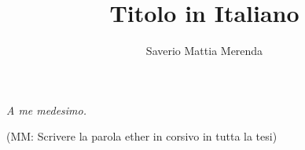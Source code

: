 \documentclass{theme/uniprthesis}
\title{Titolo in Italiano}
\author{Saverio Mattia Merenda}
\newcommand{\varemark}[2]{{\color{dkred}(#1: #2)}}
\newcommand{\mm}[1]{\varemark{MM}{#1}}
\newcommand{\mm}[1]{}
\begin{document}
\maketitle

\newpage
\thispagestyle{empty}
\null{}
\begin{flushright}
	\textit{A me medesimo.}
\end{flushright}
\null
\newpage

\pagestyle{plain}
\tableofcontents

\listoffigures    %
\listofalgorithms %


\mm{Scrivere la parola ether in corsivo in tutta la tesi}

\pagestyle{fancy}






\pagestyle{plain}



\cleardoublepage
{}






% 
%
\end{document}
